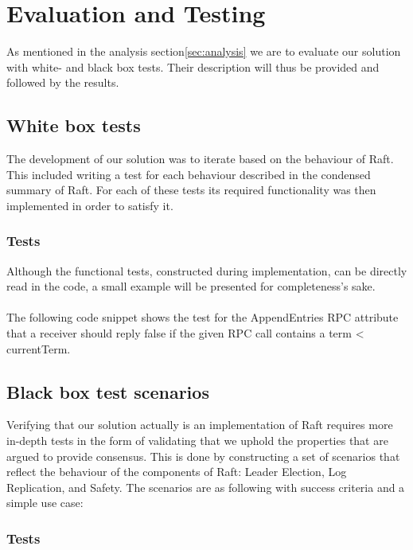 \section{Evaluation and Testing} %
\label{sec:evaluation_and_testing}
As mentioned in the analysis section\ref{sec:analysis} we are to evaluate our solution with white- and black box tests. Their description will thus be provided and followed by the results.

\subsection{White box tests}
The development of our solution was to iterate based on the behaviour of Raft. This included writing a test for each behaviour described in the condensed summary of Raft\cite{Raft}. For each of these tests its required functionality was then implemented in order to satisfy it.


\subsubsection{Tests}
Although the functional tests, constructed during implementation, can be directly read in the code, a small example will be presented for completeness's sake.\\ \\
The following code snippet shows the test for the AppendEntries RPC attribute that a receiver should reply false if the given RPC call contains a term < currentTerm.


\subsection{Black box test scenarios}
Verifying that our solution actually is an implementation of Raft requires more in-depth tests in the form of validating that we uphold the properties that are argued to provide consensus. This is done by constructing a set of scenarios that reflect the behaviour of the components of Raft: Leader Election, Log Replication, and Safety. The scenarios are as following with success criteria and a simple use case:

\subsubsection{Tests}

